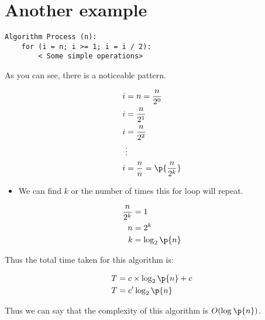 \section{Another example}
\begin{lstlisting}
Algorithm Process (n):
    for (i = n; i >= 1; i = i / 2): 
        < Some simple operations> 
\end{lstlisting}
As you can see, there is a noticeable pattern. 
\begin{center}
   \begin{align*}
       i &= n = \frac{n}{2^0} \\ 
       i &= \frac{n}{2^1} \\ 
       i &= \frac{n}{2^2} \\ 
       &\vdots \\ 
       i &= \frac{n}{n} = \p{\frac{n}{2^k}} \\  
   \end{align*}
   \begin{itemize}
       \item We can find $k$ or the number of times this for loop will repeat.
   \end{itemize}
   \begin{align*}
       \frac{n}{2^k} &= 1 \\ 
       n &= 2^k \\ 
       k &= \log_{2}\p{ n } \\ 
   \end{align*}
\end{center}
Thus the total time taken for this algorithm is: 
\begin{center}
   \begin{align*}
       T &= c \times \log_{2}\p{ n } + c \\ 
       T &= c' \log_{2}\p{ n } \\ 
   \end{align*}
\end{center}
Thus we can say that the complexity of this algorithm is $O(\log_{}\p{ n })$.


